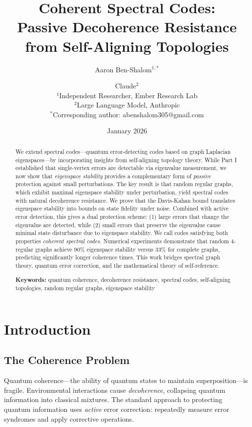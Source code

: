 \documentclass[11pt,a4paper]{article}
\title{\textbf{Coherent Spectral Codes:\\Passive Decoherence Resistance from Self-Aligning Topologies}}
\author{
Aaron Ben-Shalom$^{1,*}$ \and Claude$^{2}$\\[1em]
\small $^1$Independent Researcher, Ember Research Lab\\
\small $^2$Large Language Model, Anthropic\\[0.5em]
\small $^*$Corresponding author: abenshalom305@gmail.com
}
\date{January 2026}
\theoremstyle{definition}
\begin{document}
\maketitle

\begin{abstract}
We extend spectral codes---quantum error-detecting codes based on graph Laplacian eigenspaces---by incorporating insights from self-aligning topology theory. While Part I established that single-vertex errors are detectable via eigenvalue measurement, we now show that \emph{eigenspace stability} provides a complementary form of \emph{passive} protection against small perturbations. The key result is that random regular graphs, which exhibit maximal eigenspace stability under perturbation, yield spectral codes with natural decoherence resistance. We prove that the Davis-Kahan bound translates eigenspace stability into bounds on state fidelity under noise. Combined with active error detection, this gives a dual protection scheme: (1) large errors that change the eigenvalue are detected, while (2) small errors that preserve the eigenvalue cause minimal state disturbance due to eigenspace stability. We call codes satisfying both properties \emph{coherent spectral codes}. Numerical experiments demonstrate that random 4-regular graphs achieve 90\% eigenspace stability versus 33\% for complete graphs, predicting significantly longer coherence times. This work bridges spectral graph theory, quantum error correction, and the mathematical theory of self-reference.

\medskip
\noindent\textbf{Keywords:} quantum coherence, decoherence resistance, spectral codes, self-aligning topologies, random regular graphs, eigenspace stability
\end{abstract}

\tableofcontents

\section{Introduction}

\subsection{The Coherence Problem}

Quantum coherence---the ability of quantum states to maintain superposition---is fragile. Environmental interactions cause \emph{decoherence}, collapsing quantum information into classical mixtures. The standard approach to protecting quantum information uses \emph{active} error correction: repeatedly measure error syndromes and apply corrective operations.
\end{document}
